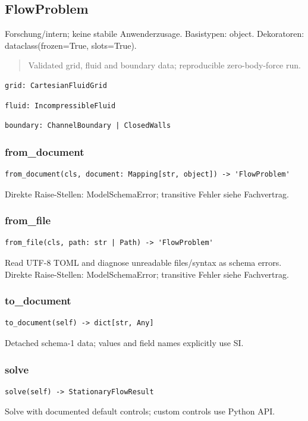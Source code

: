 \subsection{FlowProblem}
Forschung/intern; keine stabile Anwenderzusage.
Basistypen: object. Dekoratoren: dataclass(frozen=True, slots=True).
\begin{quote}
Validated grid, fluid and boundary data; reproducible zero-body-force run.
\end{quote}
\begin{lstlisting}
grid: CartesianFluidGrid
\end{lstlisting}
\begin{lstlisting}
fluid: IncompressibleFluid
\end{lstlisting}
\begin{lstlisting}
boundary: ChannelBoundary | ClosedWalls
\end{lstlisting}
\subsubsection*{from\_document}
\begin{lstlisting}
from_document(cls, document: Mapping[str, object]) -> 'FlowProblem'
\end{lstlisting}
Direkte Raise-Stellen: ModelSchemaError; transitive Fehler siehe Fachvertrag.
\subsubsection*{from\_file}
\begin{lstlisting}
from_file(cls, path: str | Path) -> 'FlowProblem'
\end{lstlisting}
Read UTF-8 TOML and diagnose unreadable files/syntax as schema errors.
Direkte Raise-Stellen: ModelSchemaError; transitive Fehler siehe Fachvertrag.
\subsubsection*{to\_document}
\begin{lstlisting}
to_document(self) -> dict[str, Any]
\end{lstlisting}
Detached schema-1 data; values and field names explicitly use SI.
\subsubsection*{solve}
\begin{lstlisting}
solve(self) -> StationaryFlowResult
\end{lstlisting}
Solve with documented default controls; custom controls use Python API.
